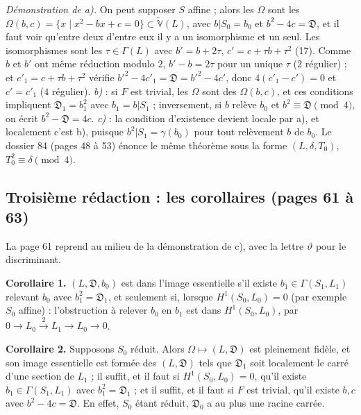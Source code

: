 \documentclass[11pt,a4paper]{article}
\begin{document}
\emph{Démonstration de a).} On peut supposer $S$ affine ; alors les $\Omega$ sont les
$\Omega(b, c) = \{x \mid x^2 - bx + c = 0\} \subset \check{\mathbb{V}}(L)$, avec
$b|S_0 = b_0$ et $b^2 - 4c = \mathfrak{D}$, et il faut voir qu'entre deux d'entre eux
il y a un isomorphisme et un seul. Les isomorphismes sont les $\tau \in \Gamma(L)$
avec $b' = b + 2\tau$, $c' = c + \tau b + \tau^2$ (17). Comme $b$ et $b'$ ont même
réduction modulo $2$, $b' - b = 2\tau$ pour un unique $\tau$ ($2$ régulier) ; et
$c'_1 = c + \tau b + \tau^2$ vérifie $b'^2 - 4c'_1 = \mathfrak{D} = b'^2 - 4c'$, donc
$4(c'_1 - c') = 0$ et $c' = c'_1$ ($4$ régulier). \emph{b)} : si $F$ est trivial, les
$\Omega$ sont des $\Omega(b, c)$, et ces conditions impliquent $\mathfrak{D}_1 = b_1^2$
avec $b_1 = b|S_1$ ; inversement, si $b$ relève $b_0$ et $b^2 \equiv \mathfrak{D}
\pmod 4$, on écrit $b^2 - \mathfrak{D} = 4c$. \emph{c)} : la condition d'existence
devient locale par a), et localement c'est b), puisque $b^2|S_1 = \gamma(b_0)$ pour
tout relèvement $b$ de $b_0$. Le dossier 84 (pages 48 à 53) énonce le même
théorème sous la forme $(L, \delta, T_0)$, $T_0^2 \equiv \delta \pmod 4$.

\subsection*{Troisième rédaction : les corollaires (pages 61 à 63)}

La page 61 reprend au milieu de la démonstration de c), avec la lettre $\vartheta$
pour le discriminant.

\textbf{Corollaire 1.} $(L, \mathfrak{D}, b_0)$ est dans l'image essentielle s'il
existe $b_1 \in \Gamma(S_1, L_1)$ relevant $b_0$ avec $b_1^2 = \mathfrak{D}_1$, et
seulement si, lorsque $H^1(S_0, L_0) = 0$ (par exemple $S_0$ affine) : l'obstruction à
relever $b_0$ en $b_1$ est dans $H^1(S_0, L_0)$, par $0 \to L_0 \xrightarrow{2} L_1
\to L_0 \to 0$.

\textbf{Corollaire 2.} Supposons $S_0$ réduit. Alors $\Omega \mapsto (L, \mathfrak{D})$
est pleinement fidèle, et son image essentielle est formée des $(L, \mathfrak{D})$ tels
que $\mathfrak{D}_1$ soit localement le carré d'une section de $L_1$ ; il suffit, et il
faut si $H^1(S_0, L_0) = 0$, qu'il existe $b_1 \in \Gamma(S_1, L_1)$ avec $b_1^2 =
\mathfrak{D}_1$ ; et il suffit, et il faut si $F$ est trivial, qu'il existe $b, c$ avec
$b^2 - 4c = \mathfrak{D}$. En effet, $S_0$ étant réduit, $\mathfrak{D}_0$ a au plus une
racine carrée.
\end{document}
